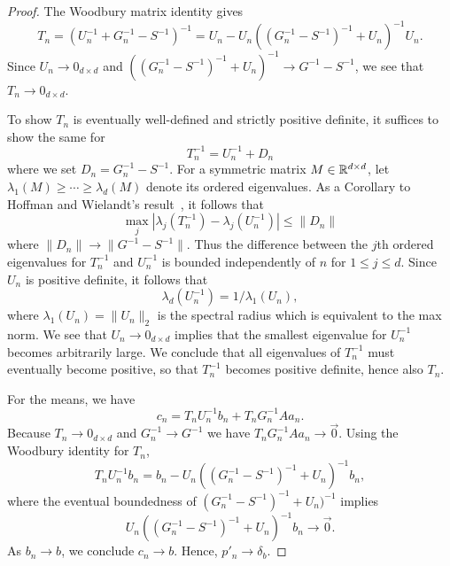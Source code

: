 \begin{proof}
The Woodbury matrix identity gives
\[
T_n = (U_n^{-1} + G_n^{-1} - S^{-1})^{-1}
= U_n - U_n((G_n^{-1} - S^{-1})^{-1}+U_n)^{-1}U_n .
\]
Since $U_n\to 0_{d\times d}$ and $((G_n^{-1} - S^{-1})^{-1}+U_n)^{-1} \to G^{-1}-S^{-1}$, we see that $T_n\to 0_{d\times d}$.  

To show $T_n$ is eventually well-defined and strictly positive definite, it suffices to show the same for \[
T_n^{-1} 
= U_n^{-1} + D_n
\]
where we set $D_n =G_n^{-1} - S^{-1}$. For a symmetric matrix $M \in \mathbb{R}^{d\times d}$, let $\lambda_1(M)\ge \dotsb \ge \lambda_d(M)$ denote its ordered eigenvalues.  As a Corollary to Hoffman and Wielandt's result~\cite[see Cor. 6.3.8. in][]{Hor13}, it follows that
\[
\max_j | \lambda_j(T_n^{-1}) - \lambda_j( U_n^{-1}) | \leq \|{D_n}\|
\]
where $\|{D_n}\| \to \|G^{-1}-S^{-1}\|$.  Thus the difference between the $j$th ordered eigenvalues for $T_n^{-1}$ and $U_n^{-1}$ is bounded independently of $n$ for $1\leq j \leq d$.  Since $U_n$ is positive definite, it follows that
\[
\lambda_d(U_n^{-1}) = 1/\lambda_1(U_n),
\]
where $\lambda_1(U_n)=\|U_n\|_2$ is the spectral radius which is equivalent to the max norm.  We see that $U_n\to 0_{d\times d}$ implies that the smallest eigenvalue for $U_n^{-1}$ becomes arbitrarily large.  We conclude that all eigenvalues of $T_n^{-1}$ must eventually become positive, so that $T_n^{-1}$ becomes positive definite, hence also $T_n$.

For the means, we have
\[
c_n = T_nU_n^{-1}b_n + T_nG_n^{-1}Aa_n .
\]
Because $T_n\to 0_{d\times d}$ and $G_n^{-1} \to G^{-1}$ we have $T_nG_n^{-1}Aa_n\to \vec 0$.  Using the Woodbury identity for $T_n$,
\[
T_nU_n^{-1}b_n
= b_n - U_n((G_n^{-1} - S^{-1})^{-1}+U_n)^{-1}b_n ,
\]
where the eventual boundedness of $(G_n^{-1} - S^{-1})^{-1}+U_n)^{-1}$ implies
\[
U_n((G_n^{-1} - S^{-1})^{-1}+U_n)^{-1}b_n \to \vec 0 .
\]
As $b_n \to b$, we conclude $c_n \to b$. Hence, $p'_n\to\delta_b$.
\end{proof}

